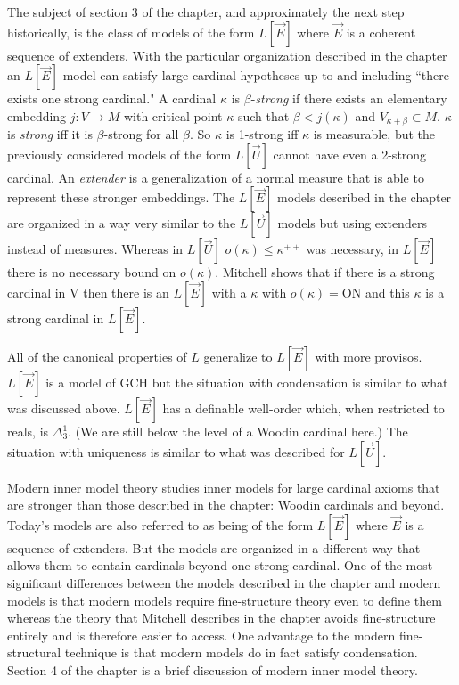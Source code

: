 \documentclass[oneside,12pt]{amsart}
\begin{document}
The subject of section 3 of the chapter, and approximately the next step historically, is the
class of models of the form $L[\vec{E}]$ where $\vec{E}$ is a coherent sequence of
extenders. With the particular organization described in the chapter an $L[\vec{E}]$
model can satisfy large cardinal hypotheses up to and including ``there exists
one strong cardinal." A cardinal $\kappa$ is $\beta$-\emph{strong} if there exists
an elementary embedding $j:V\rightarrow M$ with critical point $\kappa$ such that
$\beta<j(\kappa)$ and $V_{\kappa+\beta}\subset M$. $\kappa$ is \emph{strong} iff it is
$\beta$-strong for all $\beta$. So $\kappa$ is 1-strong iff $\kappa$ is
measurable, but the previously considered models of the form $L[\vec{U}]$ cannot have
even a 2-strong cardinal. An \emph{extender} is a generalization of a normal measure
that is able to represent these stronger embeddings. The $L[\vec{E}]$ models described
in the chapter are organized in a way very similar to the $L[\vec{U}]$ models
but using extenders instead of measures. Whereas in $L[\vec{U}]$
$o(\kappa) \le \kappa^{++}$ was necessary, in $L[\vec{E}]$ there is no necessary
bound on $o(\kappa)$. Mitchell shows that if there is a strong cardinal in V then
there is an $L[\vec{E}]$ with a $\kappa$ with $o(\kappa) = \text{ON}$ and this $\kappa$
is a strong cardinal in $L[\vec{E}]$.

All of the canonical properties
of $L$ generalize to $L[\vec{E}]$ with more provisos.
$L[\vec{E}]$ is a model of GCH but the situation with condensation is similar
to what was discussed above. $L[\vec{E}]$ has a definable well-order
which, when restricted to reals, is $\Delta^1_3$. (We are still below the
level of a Woodin cardinal here.) The situation with uniqueness is similar
to what was described for $L[\vec{U}]$.

Modern inner model theory studies inner models for large cardinal axioms that
are stronger than those described in the chapter: Woodin cardinals and beyond.
Today's models are also referred to as being of the form $L[\vec{E}]$ where $\vec{E}$
is a sequence of extenders. But the models are organized in a different way that
allows them to contain cardinals beyond one strong cardinal. One of the most significant
differences between the models described in the chapter and modern models is that
modern models require fine-structure theory even to define them whereas the theory
that Mitchell describes in the chapter avoids fine-structure entirely and is therefore
easier to access. One advantage to the modern fine-structural technique is
that modern models do in fact satisfy condensation. Section 4 of the chapter is
a brief discussion of modern inner model theory.
\end{document}

